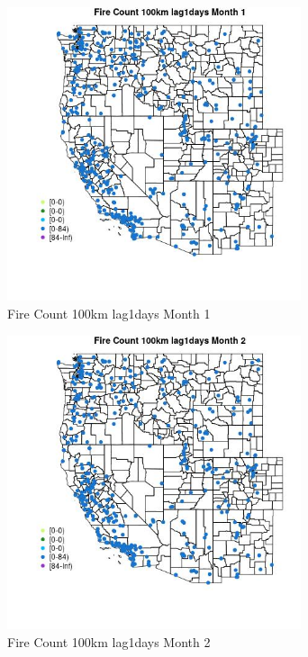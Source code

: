 \begin{figure} 
\centering  
\includegraphics[width=0.77\textwidth]{Code_Outputs/Report_ML_input_PM25_Step4_part_e_de_duplicated_aves_compiled_2019-05-18wNAs_MapObsMo1Fire_Count_100km_lag1days.jpg} 
\caption{\label{fig:Report_ML_input_PM25_Step4_part_e_de_duplicated_aves_compiled_2019-05-18wNAsMapObsMo1Fire_Count_100km_lag1days}Fire Count 100km lag1days Month 1} 
\end{figure} 
 

\begin{figure} 
\centering  
\includegraphics[width=0.77\textwidth]{Code_Outputs/Report_ML_input_PM25_Step4_part_e_de_duplicated_aves_compiled_2019-05-18wNAs_MapObsMo2Fire_Count_100km_lag1days.jpg} 
\caption{\label{fig:Report_ML_input_PM25_Step4_part_e_de_duplicated_aves_compiled_2019-05-18wNAsMapObsMo2Fire_Count_100km_lag1days}Fire Count 100km lag1days Month 2} 
\end{figure} 
 

